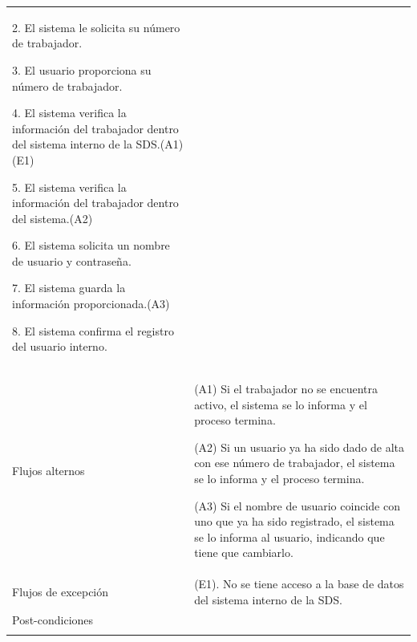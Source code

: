 \begin{longtable}{@{\extracolsep{8pt}}l p{8.5cm}}
 2. El sistema le solicita su número de trabajador. \par\vspace{.1cm}

 3. El usuario proporciona su número de trabajador. \par\vspace{.1cm}

 4. El sistema verifica la información del trabajador dentro del sistema interno de la SDS.(A1)(E1) \par\vspace{.1cm}

 5. El sistema verifica la información del trabajador dentro del sistema.(A2) \par\vspace{.1cm}

 6. El sistema solicita un nombre de usuario y contraseña. \par\vspace{.1cm}

 7. El sistema guarda la información proporcionada.(A3) \par\vspace{.1cm}

 8. El sistema confirma el registro del usuario interno. \par\vspace{.1cm}

   \par\vspace{.1cm}

\\

\hspace{.2cm}Flujos alternos & 
\par (A1) Si el trabajador no se encuentra activo, el sistema se lo informa y el proceso termina.

\par (A2) Si un usuario ya ha sido dado de alta con ese número de trabajador, el sistema se lo informa y el proceso termina.

\par (A3) Si el nombre de usuario coincide con uno que ya ha sido registrado, el sistema se lo informa al usuario, indicando que tiene que cambiarlo. 



\\

\hspace{.2cm}Flujos de excepción & 
\par\vspace{.1cm} (E1). No se tiene acceso a la base de datos del sistema interno de la SDS.


\\%

\hspace{.2cm}Post-condiciones & 
\\
\hline

 \\
\end{longtable}
\endgroup


